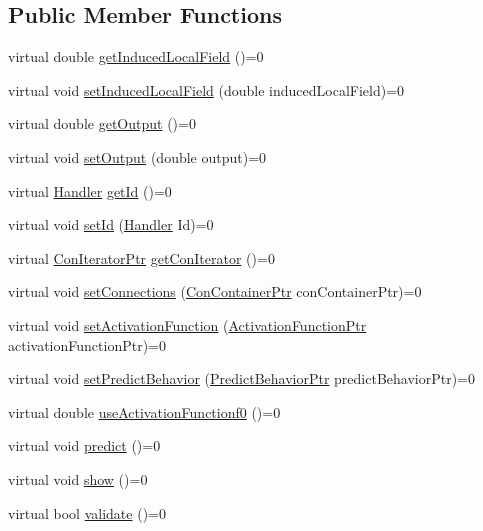 \subsection*{Public Member Functions}
\begin{DoxyCompactItemize}
\item 
virtual double \hyperlink{class_neuron_a1b7eea569128502e3387f5b50751a119}{getInducedLocalField} ()=0
\item 
virtual void \hyperlink{class_neuron_ab7244964f798eb9cace1cb916f5ef359}{setInducedLocalField} (double inducedLocalField)=0
\item 
virtual double \hyperlink{class_neuron_a43ac0c8461c610bb2b82017d597435e3}{getOutput} ()=0
\item 
virtual void \hyperlink{class_neuron_aae94f78cfa7ed3ce4935f23a3a585f95}{setOutput} (double output)=0
\item 
virtual \hyperlink{_a_m_o_r_e_8h_abc871abb71cff6655b8172ee7240b8ef}{Handler} \hyperlink{class_neuron_a1a34edd39fba70be1d18219d5e9e1eea}{getId} ()=0
\item 
virtual void \hyperlink{class_neuron_a65331c891ac34a344d0bb791073a8dd9}{setId} (\hyperlink{_a_m_o_r_e_8h_abc871abb71cff6655b8172ee7240b8ef}{Handler} Id)=0
\item 
virtual \hyperlink{_a_m_o_r_e_8h_a819efaf710ead601ac8241df5e235dd8}{ConIteratorPtr} \hyperlink{class_neuron_ac52554d6ba02e8eec2dd04a150169ec9}{getConIterator} ()=0
\item 
virtual void \hyperlink{class_neuron_a71b7dba693e9afad7e9fcfc0cee9a801}{setConnections} (\hyperlink{_a_m_o_r_e_8h_a1021dbaf961d1c8da6d58a8566e5778b}{ConContainerPtr} conContainerPtr)=0
\item 
virtual void \hyperlink{class_neuron_ab73922d2dba9f86ab192e2bb87c6a1aa}{setActivationFunction} (\hyperlink{_a_m_o_r_e_8h_a77602a0277a02e5769c3df0adc669b17}{ActivationFunctionPtr} activationFunctionPtr)=0
\item 
virtual void \hyperlink{class_neuron_af21848d0ef33bec5587e4c2702c83e3f}{setPredictBehavior} (\hyperlink{_a_m_o_r_e_8h_a1fb2f1f8fdf1e08c42ef4bdce436af93}{PredictBehaviorPtr} predictBehaviorPtr)=0
\item 
virtual double \hyperlink{class_neuron_a78c90ab1f5d18b2d7cb8f366391b7821}{useActivationFunctionf0} ()=0
\item 
virtual void \hyperlink{class_neuron_a7181d8d0a5f9b0e4ff39410785f087e9}{predict} ()=0
\item 
virtual void \hyperlink{class_neuron_ae18a86f9b67c63a6fcb28c813b47a38d}{show} ()=0
\item 
virtual bool \hyperlink{class_neuron_a37f57f44fefa328ea0b7ab32b52c853e}{validate} ()=0
\end{DoxyCompactItemize}
